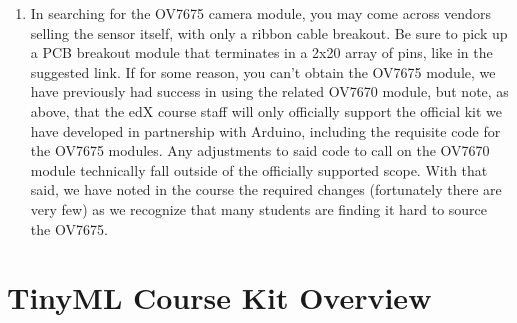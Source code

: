 \begin{enumerate}
  \item In searching for the OV7675 camera module, you may come across vendors selling the sensor itself, with only a ribbon cable breakout. Be sure to pick up a PCB breakout module that terminates in a 2x20 array of pins, like in the suggested link. If for some reason, you can’t obtain the OV7675 module, we have previously had success in using the related OV7670 module, but note, as above, that the edX course staff will only officially support the official kit we have developed in partnership with Arduino, including the requisite code for the OV7675 modules. Any adjustments to said code to call on the OV7670 module technically fall outside of the officially supported scope. With that said, we have noted in the course the required changes (fortunately there are very few) as we recognize that many students are finding it hard to source the OV7675.
\end{enumerate}


\section{TinyML Course Kit Overview}


